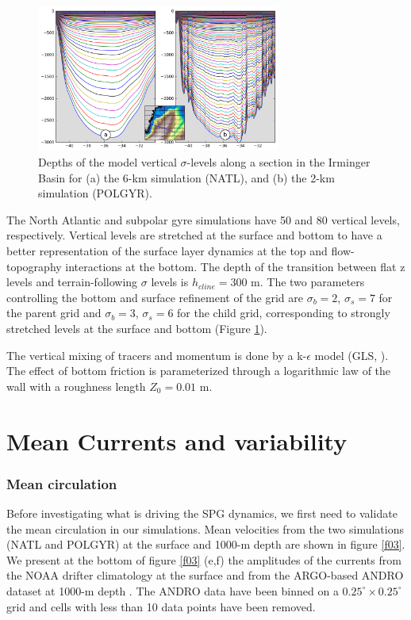 \documentclass[os, manuscript]{copernicus}
\begin{document}
\begin{figure}[t]
\includegraphics[width=8cm]{../fig_os/f02.pdf}
\caption{Depths of the model vertical $\sigma$-levels along a section in the Irminger Basin for (a) the 6-km simulation (NATL), and (b) the 2-km simulation (POLGYR).}
\label{f02}
\end{figure} 


The North Atlantic and subpolar gyre simulations have 50 and 80 vertical levels, respectively. Vertical levels are stretched at the surface and bottom \citep{lemarie2012} to have a better representation of the surface layer dynamics at the top and flow-topography interactions at the bottom. The depth of the transition between flat z levels and terrain-following $\sigma$ levels is $h_{cline} = 300$ m. The two parameters controlling the bottom and surface refinement of the grid are $\sigma _b=2$, $\sigma _s=7$ for the parent grid and $\sigma _b=3$, $\sigma _s=6$ for the child grid, corresponding to strongly stretched levels at the surface and bottom (Figure \ref{f02}).

The vertical mixing of tracers and momentum is done by a k-$\epsilon$ model (GLS, \citet{umlauf2003}). The effect of bottom friction is parameterized through a logarithmic law of the wall with a roughness length $Z_{0} = 0.01$ m.


\section{Mean Currents and variability}
\subsubsection{Mean circulation}
Before investigating what is driving the SPG dynamics, we first need to validate the mean circulation in our simulations. Mean velocities from the two simulations (NATL and POLGYR) at the surface and 1000-m depth are shown in figure \ref{f03}. We present at the bottom of figure \ref{f03} (e,f) the amplitudes of the currents from the NOAA drifter climatology \citep{laurindo2017} at the surface and from the ARGO-based ANDRO dataset at 1000-m depth \citep{ollitrault2013,lebedev2007}. The ANDRO data have been binned on a $0.25^{\circ}\times 0.25^{\circ}$ grid and cells with less than 10 data points have been removed. 
\end{document}
